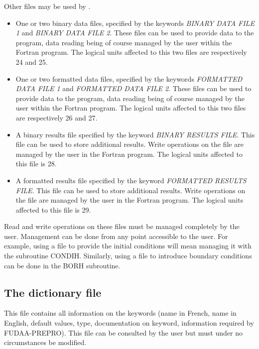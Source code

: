 Other files may be used by \artemis{}.

\begin{itemize}
\item  One or two binary data files, specified by the keywords
  \textit{BINARY DATA FILE 1} and \textit{BINARY DATA FILE 2}. These files can
    be used to provide data to the
    program, data reading being of course managed by the user within the
    Fortran program. The logical units affected to this two files are
    respectively 24 and 25.

\item  One or two formatted data files, specified by the keywords
  \textit{FORMATTED DATA FILE 1} and \textit{FORMATTED DATA FILE 2}. These
    files can be used to provide data to the program, data reading being of
    course managed by the user within the Fortran program. The logical units
    affected to this two files are respectively 26 and 27.

\item  A binary results file specified by the keyword \textit{BINARY RESULTS
  FILE}. This file can be used to store additional results. Write operations on
    the file are managed by the user in the Fortran program. The logical units
    affected to this file is 28.

\item  A formatted results file specified by the keyword \textit{FORMATTED
  RESULTS FILE}. This file can be used to store additional results. Write
    operations on the file are managed by the user in the Fortran program. The
    logical units affected to this file is 29.
\end{itemize}

Read and write operations on these files must be managed completely by the
user. Management can be done from any point accessible to the user. For
example, using a file to provide the initial conditions will mean managing it
with the subroutine CONDIH\@. Similarly, using a file to introduce boundary
conditions can be done in the BORH subroutine.


\subsection{The dictionary file}

This file contains all information on the keywords (name in French, name in
English, default values, type, documentation on keyword, information required
by FUDAA-PREPRO). This file can be consulted by the user but must under no
circumstances be modified.


